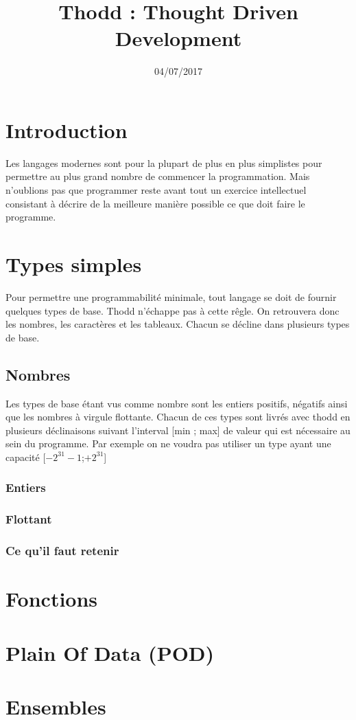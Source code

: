 \documentclass{book}
\title{Thodd : Thought Driven Development}
\date{04/07/2017}
\begin{document}
\maketitle
\tableofcontents

\newpage

\section{Introduction}

Les langages modernes sont pour la plupart de plus en plus simplistes pour permettre au plus grand nombre de commencer la programmation. Mais n'oublions pas que programmer reste avant tout un exercice intellectuel consistant à décrire de la meilleure manière possible ce que doit faire le programme. 

\section{Types simples}

Pour permettre une programmabilité minimale, tout langage se doit de fournir quelques types de base. Thodd n'échappe pas à cette rêgle. On retrouvera donc les nombres, les caractères et les tableaux. Chacun se décline dans plusieurs types de base. 

\subsection{Nombres}

Les types de base étant vus comme nombre sont les entiers positifs, négatifs ainsi que les nombres à virgule flottante. Chacun de ces types sont livrés avec thodd en plusieurs déclinaisons suivant l'interval [min ; max] de valeur qui est nécessaire au sein du programme. Par exemple on ne voudra pas utiliser un type ayant une capacité [$-2^{31}-1$;$+2^{31}$]

\subsubsection{Entiers}

\subsubsection{Flottant}

\subsubsection{Ce qu'il faut retenir}
 


\section{Fonctions}

\section{Plain Of Data (POD)}

\section{Ensembles}
\end{document}
